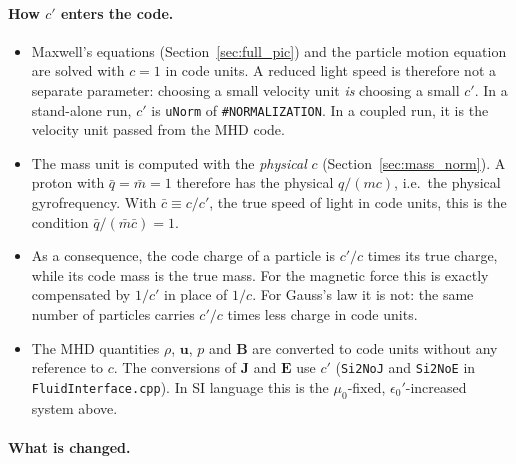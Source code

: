 \documentclass[a4paper, 11pt]{article}
\begin{document}
\paragraph{How $c'$ enters the code.}
\begin{itemize}
  \item Maxwell's equations (Section~\ref{sec:full_pic}) and the particle motion equation are solved with $c = 1$ in code units. A reduced light speed is therefore not a separate parameter: choosing a small velocity unit \emph{is} choosing a small $c'$. In a stand-alone run, $c'$ is \texttt{uNorm} of \texttt{\#NORMALIZATION}. In a coupled run, it is the velocity unit passed from the MHD code.
  \item The mass unit is computed with the \emph{physical} $c$ (Section~\ref{sec:mass_norm}). A proton with $\bar{q} = \bar{m} = 1$ therefore has the physical $q/(mc)$, i.e.\ the physical gyrofrequency. With $\bar{c} \equiv c/c'$, the true speed of light in code units, this is the condition $\bar{q}/(\bar{m}\bar{c}) = 1$.
  \item As a consequence, the code charge of a particle is $c'/c$ times its true charge, while its code mass is the true mass. For the magnetic force this is exactly compensated by $1/c'$ in place of $1/c$. For Gauss's law it is not: the same number of particles carries $c'/c$ times less charge in code units.
  \item The MHD quantities $\rho$, $\mathbf{u}$, $p$ and $\mathbf{B}$ are converted to code units without any reference to $c$. The conversions of $\mathbf{J}$ and $\mathbf{E}$ use $c'$ (\texttt{Si2NoJ} and \texttt{Si2NoE} in \texttt{FluidInterface.cpp}). In SI language this is the $\mu_0$-fixed, $\epsilon_0'$-increased system above.
\end{itemize}

\paragraph{What is changed.}
\end{document}
